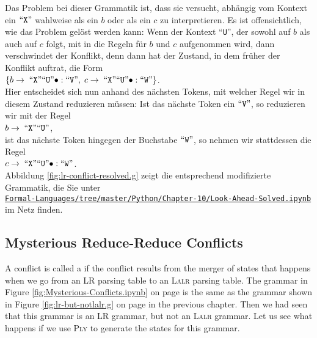 Das Problem bei dieser Grammatik ist, dass sie versucht, abh\"angig vom Kontext ein $\mbox{``\texttt{X}''}$ wahlweise
als ein $b$ oder als ein $c$ zu interpretieren.  Es ist offensichtlich, wie das Problem gel\"ost werden
kann:  Wenn der Kontext ``\texttt{U}'', der sowohl auf $b$ als auch auf $c$ folgt, mit in
die Regeln f\"ur $b$ und $c$ aufgenommen wird, dann verschwindet der Konflikt, denn dann hat der
Zustand, in dem fr\"uher der Konflikt auftrat, die Form
\\[0.2cm]
\hspace*{1.3cm}
$\{ b \rightarrow \;\mbox{``\texttt{X}''} \mbox{``\texttt{U}''}\bullet: \mbox{``\texttt{V}''},\; 
    c \rightarrow \;\mbox{``\texttt{X}''} \mbox{``\texttt{U}''}\bullet: \mbox{``\texttt{W}''} 
\}
$.
\\[0.2cm]  
Hier entscheidet sich nun anhand des n\"achsten Tokens, mit welcher Regel wir in diesem Zustand
reduzieren m\"ussen:  Ist das n\"achste Token ein $\mbox{``\texttt{V}''}$, so reduzieren wir mit der Regel
\\[0.2cm]
\hspace*{1.3cm}
$b \rightarrow \;\mbox{``\texttt{X}''} \mbox{``\texttt{U}''}$,
\\[0.2cm]
ist das n\"achste Token hingegen der Buchstabe $\mbox{``\texttt{W}''}$, so nehmen wir stattdessen die Regel
\\[0.2cm]
\hspace*{1.3cm}
$c \rightarrow \;\mbox{``\texttt{X}''} \mbox{``\texttt{U}''}\bullet: \mbox{``\texttt{W}''}$.
\\[0.2cm]
Abbildung
\ref{fig:lr-conflict-resolved.g} zeigt die entsprechend modifizierte Grammatik, die Sie unter
\\[0.2cm]
\hspace*{1.3cm}
\href{https://github.com/karlstroetmann/Formal-Languages/tree/master/Python/Chapter-10/Look-Ahead-Solved.ipynb}{\texttt{Formal-Languages/tree/master/Python/Chapter-10/Look-Ahead-Solved.ipynb}}
\\[0.2cm]
im Netz finden.


\subsection{Mysterious Reduce-Reduce Conflicts}
A conflict is called a   if the conflict results from the merger of
states that happens when we go from an LR parsing table to an \textsc{Lalr} parsing table.  The grammar in Figure
\ref{fig:Mysterious-Conflicts.ipynb} on page \pageref{fig:Mysterious-Conflicts.ipynb} is the same as the
grammar shown in Figure \ref{fig:lr-but-notlalr.g} on page \pageref{fig:lr-but-notlalr.g} in the previous
chapter.  Then we had seen that this grammar is an LR grammar, but not an \textsc{Lalr} grammar.  Let us see what happens
if we use \textsc{Ply} to generate the states for this grammar.

